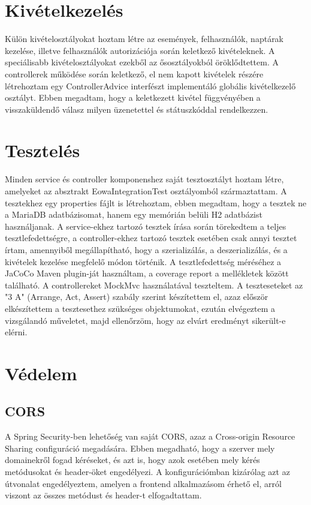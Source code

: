\documentclass[a4paper,12pt]{report}
\theoremstyle{definition}
\theoremstyle{remark}
\begin{document}
\section{Kivételkezelés}

Külön kivételosztályokat hoztam létre az események, felhasználók, naptárak kezelése, illetve felhasználók autorizációja során keletkező kivételeknek. A speciálisabb kivételosztályokat ezekből az ősosztályokból öröklődtettem. A controllerek működése során keletkező, el nem kapott kivételek részére létrehoztam egy ControllerAdvice interfészt implementáló globális kivételkezelő osztályt. Ebben megadtam, hogy a keletkezett kivétel függvényében a visszaküldendő válasz milyen üzenetettel és státuszkóddal rendelkezzen.

\section{Tesztelés}

Minden service és controller komponenshez saját tesztosztályt hoztam létre, amelyeket az absztrakt EowaIntegrationTest osztályomból származtattam.  A tesztekhez egy properties fájlt is létrehoztam, ebben megadtam, hogy a tesztek ne a MariaDB adatbázisomat, hanem egy memórián belüli H2 adatbázist használjanak. A service-ekhez tartozó tesztek írása során törekedtem a teljes tesztlefedettségre, a controller-ekhez tartozó tesztek esetében csak annyi tesztet írtam, amennyiből megállapítható, hogy a szerializálás, a deszerializálás, és a kivételek kezelése megfelelő módon történik. A tesztlefedettség méréséhez a JaCoCo\cite{Jacocowebsite} Maven plugin-ját használtam, a coverage report a mellékletek között található. A controllereket MockMvc használatával teszteltem. A teszteseteket az "3 A"\cite{3Awebsite} (Arrange, Act, Assert) szabály szerint készítettem el, azaz először elkészítettem a tesztesethez szükséges objektumokat, ezután elvégeztem a vizsgálandó műveletet, majd ellenőrzöm, hogy az elvárt eredményt sikerült-e elérni.

\section{Védelem}

	\subsection{CORS}

A Spring Security-ben lehetőség van saját CORS, azaz a Cross-origin Resource Sharing\cite{Corswebsite} configuráció megadására. Ebben megadható, hogy a szerver mely domainekről fogad kéréseket, és azt is, hogy azok esetében mely kérés metódusokat és header-öket engedélyezi. A konfigurációmban kizárólag azt az útvonalat engedélyeztem, amelyen a frontend alkalmazásom érhető el, arról viszont az összes metódust és header-t elfogadtattam.
\end{document}
